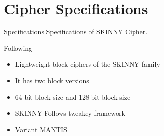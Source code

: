 \section{Cipher Specifications}
\begin{frame}{Specifications}
	Specifications of SKINNY Cipher.
	\begin{block}{Following}
		
		\begin{itemize}[<+->]
			\item Lightweight block ciphers of the SKINNY family
			\item It has two block versions
			\item 64-bit block size and 128-bit block size
			\item SKINNY Follows tweakey framework
			\item Variant MANTIS
		\end{itemize}
	\end{block}
\end{frame}